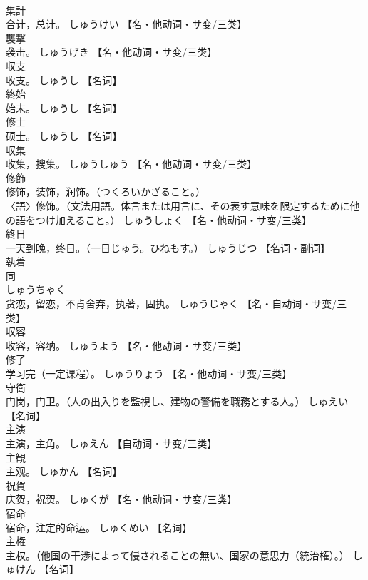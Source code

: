 \documentclass[8pt]{extreport}
\begin{document}
\begin{CJK}{UTF8}{min}
\\	集計	
\\	合计，总计。	しゅうけい		【名・他动词・サ变/三类】
\\	襲撃	
\\	袭击。	しゅうげき		【名・他动词・サ变/三类】
\\	収支	
\\	收支。	しゅうし		【名词】
\\	終始	
\\	始末。	しゅうし		【名词】
\\	修士	
\\	硕士。	しゅうし		【名词】
\\	収集	
\\	收集，搜集。	しゅうしゅう		【名・他动词・サ变/三类】
\\	修飾	
\\	修饰，装饰，润饰。（つくろいかざること。） 
\\	〈語〉修饰。（文法用語。体言または用言に、その表す意味を限定するために他の語をつけ加えること。）	しゅうしょく		【名・他动词・サ变/三类】
\\	終日	
\\	一天到晚，终日。（一日じゅう。ひねもす。）	しゅうじつ		【名词・副词】
\\	執着	
\\	同 
\\	しゅうちゃく 
\\	贪恋，留恋，不肯舍弃，执著，固执。	しゅうじゃく		【名・自动词・サ变/三类】
\\	収容	
\\	收容，容纳。	しゅうよう		【名・他动词・サ变/三类】
\\	修了	
\\	学习完（一定课程）。	しゅうりょう		【名・他动词・サ变/三类】
\\	守衛	
\\	门岗，门卫。（人の出入りを監視し、建物の警備を職務とする人。）	しゅえい		【名词】
\\	主演	
\\	主演，主角。	しゅえん		【自动词・サ变/三类】
\\	主観	
\\	主观。	しゅかん		【名词】
\\	祝賀	
\\	庆贺，祝贺。	しゅくが		【名・他动词・サ变/三类】
\\	宿命	
\\	宿命，注定的命运。	しゅくめい		【名词】
\\	主権	
\\	主权。（他国の干渉によって侵されることの無い、国家の意思力（統治権）。）	しゅけん		【名词】

\end{CJK}
\end{document}

